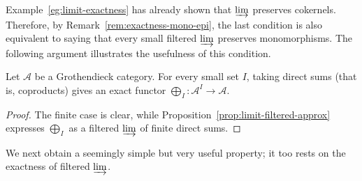 Example~\ref{eg:limit-exactness} has already shown that $\varinjlim$ preserves
cokernels. Therefore, by Remark~\ref{rem:exactness-mono-epi}, the last
condition is also equivalent to saying that every small filtered
$\varinjlim$ preserves monomorphisms. The following argument illustrates the
usefulness of this condition.

\begin{proposition}\label{prop:Grothendieck-cat-coprod-exact}
Let $\mathcal{A}$ be a Grothendieck category. For every small set $I$, taking
direct sums (that is, coproducts) gives an exact functor
$\bigoplus_I:\mathcal{A}^I\to\mathcal{A}$.
\end{proposition}
\begin{proof}
The finite case is clear, while Proposition~\ref{prop:limit-filtered-approx}
expresses $\bigoplus_I$ as a filtered $\varinjlim$ of finite direct sums.
\end{proof}

We next obtain a seemingly simple but very useful property; it too rests on
the exactness of filtered $\varinjlim$.

